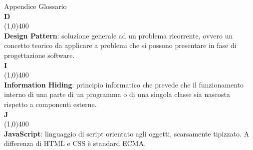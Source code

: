 \newpage
\huge{Appendice Glossario}\\
\newline
\LARGE{\textbf{D}} \\
\line(1,0){400}\\
\newline
\textbf{Design Pattern}: soluzione generale ad un problema ricorrente, ovvero un concetto teorico da applicare a problemi che si possono presentare in fase di progettazione software.\\
\newline
\LARGE{\textbf{I}} \\
\line(1,0){400}\\
\newline
\textbf{Information Hiding}: principio informatico che prevede che il funzionamento interno di una parte di un programma o di una singola classe sia nascosta rispetto a componenti esterne.\\
\newline
\LARGE{\textbf{J}} \\
\line(1,0){400}\\
\newline
\textbf{JavaScript}: linguaggio di script orientato agli oggetti, scarsamente tipizzato. A differenza di HTML e CSS è standard ECMA.
